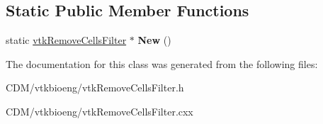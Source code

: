 \subsection*{Static Public Member Functions}
\begin{DoxyCompactItemize}
\item 
\hypertarget{classvtkRemoveCellsFilter_aad568d99505195e3b6d7bc9d89bad556}{
static \hyperlink{classvtkRemoveCellsFilter}{vtkRemoveCellsFilter} $\ast$ {\bfseries New} ()}
\label{classvtkRemoveCellsFilter_aad568d99505195e3b6d7bc9d89bad556}

\end{DoxyCompactItemize}


The documentation for this class was generated from the following files:\begin{DoxyCompactItemize}
\item 
CDM/vtkbioeng/vtkRemoveCellsFilter.h\item 
CDM/vtkbioeng/vtkRemoveCellsFilter.cxx\end{DoxyCompactItemize}

